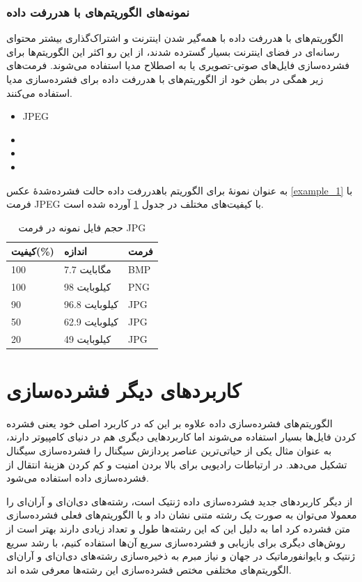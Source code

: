 \subsubsection{نمونه‌های الگوریتم‌های با هدررفت داده}
الگوریتم‌های با هدررفت داده با همه‌گیر شدن اینترنت و اشتراک‌گذاری 
بیشتر محتوای رسانه‌ای در فضای اینترنت بسیار گسترده شدند، از این رو اکثر این الگوریتم‌ها برای فشرده‌سازی فایل‌های صوتی-تصویری یا به اصطلاح 
مدیا
استفاده می‌شوند. فرمت‌های زیر همگی در بطن خود از الگوریتم‌های با هدررفت داده برای فشرده‌سازی مدیا استفاده می‌کنند.

\begin{itemize}
	\item JPEG
	\item {}
	\item {}
	\item {}
\end{itemize}
به عنوان نمونهٔ برای الگوریتم باهدررفت داده 
حالت فشرده‌شدهٔ عکس 
\ref{example_1}
با فرمت JPEG 
با کیفیت‌های مختلف در جدول 
\ref{compare_2}
آورده شده است.

\begin{table}[h]
	\centering
	\caption{حجم فایل نمونه در فرمت JPG}
	\label{compare_2}
	\begin{tabular}{@{}lll@{}}
	\toprule
	کیفیت(\%) & اندازه & فرمت \\ \midrule
	100 & 7.7 مگابایت & BMP \\
	100 & 98 کیلوبایت & PNG \\
	90 & 96.8 کیلوبایت & JPG \\
	50 & 62.9 کیلوبایت & JPG \\
	20 & 49  کیلوبایت& JPG \\ \bottomrule
	\end{tabular}
	\end{table}


\section{کاربردهای دیگر فشرده‌سازی}
الگوریتم‌های فشرده‌سازی داده علاوه بر این که در کاربرد اصلی خود یعنی فشرده کردن فایل‌ها بسیار استفاده می‌شوند اما کاربردهایی دیگری هم در دنیای
کامپیوتر دارند، به عنوان مثال یکی از حیاتی‌ترین عناصر پردازش سیگنال 
را فشرده‌سازی سیگنال تشکیل می‌دهد. در ارتباطات رادیویی برای بالا بردن امنیت و کم کردن هزینهٔ انتقال از فشرده‌سازی داده استفاده می‌شود. 

از دیگر کاربردهای جدید فشرده‌سازی داده ژنتیک است، رشته‌های دی‌ان‌ای
و آر‌ان‌ای
 را معمولا می‌توان به صورت
یک رشته متنی نشان داد و با الگوریتم‌های فعلی فشرده‌سازی متن فشرده کرد اما به دلیل این که این رشته‌ها طول و تعداد زیادی دارند
بهتر است از روش‌های دیگری برای بازیابی و فشرده‌سازی سریع آن‌ها استفاده کنیم، با رشد سریع ژنتیک و بایوانفورماتیک در جهان و نیاز
مبرم به ذخیره‌سازی رشته‌های دی‌ان‌ای و آران‌ای 
الگوریتم‌های مختلفی مختص فشرده‌سازی این رشته‌ها معرفی شده اند\cite{dna}. 